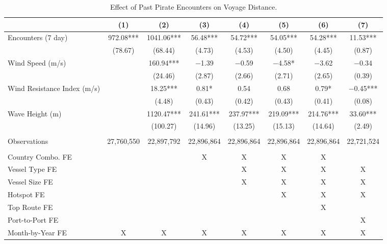 \begin{table}
\centering
\caption{Effect of Past Pirate Encounters on Voyage Distance. \label{tab:spec-dist-table}}
\centering
\begin{adjustbox}{width = .9\textwidth}
\begin{threeparttable}
\begin{tabular}[t]{lccccccc}
\toprule
  & (1) & (2) & (3) & (4) & (5) & (6) & (7)\\
\midrule
Encounters (7 day) & \num{972.08}*** & \num{1041.06}*** & \num{56.48}*** & \num{54.72}*** & \num{54.05}*** & \num{54.28}*** & \num{11.53}***\\
 & (\num{78.67}) & (\num{68.44}) & (\num{4.73}) & (\num{4.53}) & (\num{4.50}) & (\num{4.45}) & (\num{0.87})\\
Wind Speed (m/s) &  & \num{160.94}*** & \num{-1.39} & \num{-0.59} & \num{-4.58}* & \num{-3.62} & \num{-0.34}\\
 &  & (\num{24.46}) & (\num{2.87}) & (\num{2.66}) & (\num{2.71}) & (\num{2.65}) & (\num{0.39})\\
Wind Resistance Index (m/s) &  & \num{18.25}*** & \num{0.81}* & \num{0.54} & \num{0.68} & \num{0.79}* & \num{-0.45}***\\
 &  & (\num{4.48}) & (\num{0.43}) & (\num{0.42}) & (\num{0.43}) & (\num{0.41}) & (\num{0.08})\\
Wave Height (m) &  & \num{1120.47}*** & \num{241.61}*** & \num{237.97}*** & \num{219.09}*** & \num{214.76}*** & \num{33.60}***\\
 &  & (\num{100.27}) & (\num{14.96}) & (\num{13.25}) & (\num{15.13}) & (\num{14.64}) & (\num{2.49})\\
 &  &  &  &  &  &  & \\
Observations & 27,760,550 & 22,897,792 & 22,896,864 & 22,896,864 & 22,896,864 & 22,896,864 & 22,721,524\\
 &  &  &  &  &  &  & \\
Country Combo. FE &  &  & X & X & X & X & \\
Vessel Type FE &  &  &  & X & X & X & X\\
Vessel Size FE &  &  &  & X & X & X & X\\
Hotspot FE &  &  &  &  & X & X & X\\
Top Route FE &  &  &  &  &  & X & \\
Port-to-Port FE &  &  &  &  &  &  & X\\
Month-by-Year FE & X & X & X & X & X & X & X\\
\bottomrule
\end{tabular}

\end{threeparttable}
\end{adjustbox}
\end{table}
